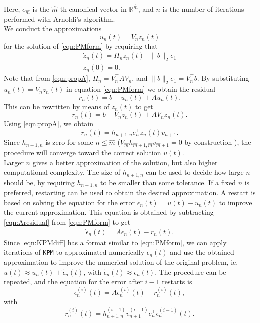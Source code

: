 \noindent Here, $e_{\hat{m}}$ is the $\hat{m}$-th canonical vector in $\mathbb{R}^{\hat{m}}$, and $n$ is the number of iterations performed with Arnoldi's algorithm.\\

\noindent We conduct the approximations 
\begin{equation*}
u_n(t) = V_n z_n(t)
\end{equation*}
for the solution of \eqref{eqn:PMform} by requiring that
\begin{equation}
\begin{aligned}
\dot{z}_n(t) = H_n z_n(t) + \| b \|_2 e_1\\
z_n(0) = 0.
\end{aligned}
\label{eqn:stuff}
\end{equation}
Note that from \eqref{eqn:propA}, $H_n = V_n^\top A V_n$, and $\|b \|_2 e_1 = V_n^\top b$. By substituting $u_n(t) = V_n z_n(t)$ in equation \eqref{eqn:PMform} we obtain the residual
\begin{equation*}
r_n(t) = b -\dot{u}_n(t) + A u_n(t).
\end{equation*}
This can be rewritten by means of $z_n(t)$ to get
\begin{equation*}
r_n(t) = b - V_n \dot{z}_n(t) + A V_n z_n(t).
\end{equation*}
Using \eqref{eqn:propA}, we obtain
\begin{equation}
r_n(t) = h_{n+1,n} e_n^\top z_n(t) v_{n+1}.
\label{eqn:Aresidual}
\end{equation}
\noindent Since $h_{n+1,n}$ is zero for some $n \leq \hat{m}$ ($V_{\hat{m}} h_{\hat{m}+1,\hat{m}} v_{\hat{m}+1} = 0 $ by construction \cite{arnoldconv}), the procedure will converge toward the correct solution $u(t)$. \\

\noindent Larger $n$ gives a better approximation of the solution, but also higher computational complexity. The size of $h_{n+1,n}$ can be used to decide how large $n$ should be, by requiring $h_{n+1,n} $ to be smaller than some tolerance. If a fixed $n$ is preferred, restarting can be used to obtain the desired approximation.
\noindent A restart is based on solving the equation for the error $\epsilon_n(t) = u(t)-u_n(t)$ to improve the current approximation. This equation is obtained by subtracting \eqref{eqn:Aresidual} from \eqref{eqn:PMform} to get
\begin{equation}
\begin{aligned}
\dot{\epsilon}_n(t)=A \epsilon_n (t)  - r_n(t).
\end{aligned}
\label{eqn:KPMdiff}
\end{equation}
Since \eqref{eqn:KPMdiff} has a format similar to \eqref{eqn:PMform}, we can apply iterations of \texttt{KPM} to approximated numerically $\epsilon_n(t)$ and use the obtained approximation to improve the numerical solution of the original problem, ie. $u(t) \approx u_n(t) + \tilde{\epsilon}_n(t)$, with $\tilde{\epsilon}_n(t) \approx \epsilon_n(t)$. The procedure can be repeated, and the equation for the error after $i-1$ restarts is $$\epsilon_n^{(i)}(t) = A\epsilon_n^{(i)}(t) - r_n^{(i)}(t),$$ with $$ r_n^{(i)}(t) = h_{n+1,n}^{(i-1)} v_{n+1}^{(i-1)} e_n^{\top} \epsilon_n^{(i-1)} (t). $$

